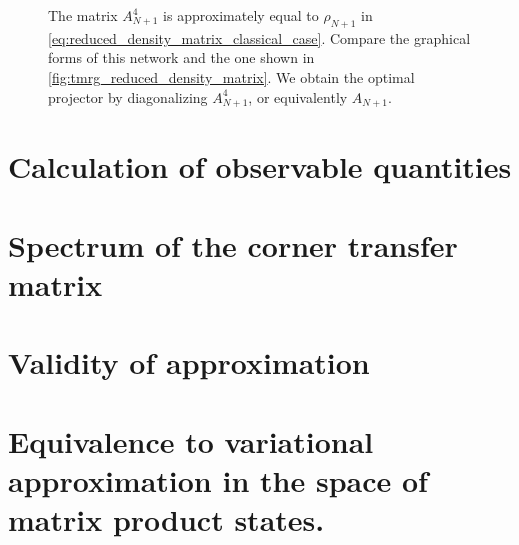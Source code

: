 \begin{figure}
  
  \caption{The matrix $A_{N+1}^4$ is approximately equal to $\rho_{N+1}$ in
  \autoref{eq:reduced_density_matrix_classical_case}. Compare the graphical forms of this
  network and the one shown in \autoref{fig:tmrg_reduced_density_matrix}. We obtain the
  optimal projector by diagonalizing $A_{N + 1}^4$, or equivalently $A_{N+1}$.}
  \label{fig:ctmrg_reduced_density_matrix}
\end{figure}



\section{Calculation of observable quantities}


\section{Spectrum of the corner transfer matrix}

\section{Validity of approximation}



\section{Equivalence to variational approximation in the space of matrix product states.}

